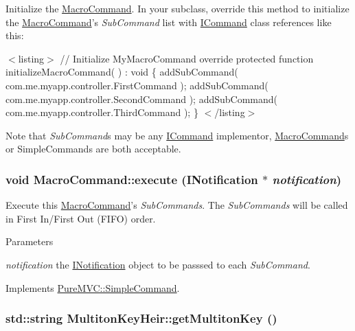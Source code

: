 Initialize the {\ttfamily \hyperlink{class_pure_m_v_c_1_1_macro_command}{MacroCommand}}. In your subclass, override this method to initialize the {\ttfamily \hyperlink{class_pure_m_v_c_1_1_macro_command}{MacroCommand}}'s {\itshape SubCommand\/} list with {\ttfamily \hyperlink{class_pure_m_v_c_1_1_i_command}{ICommand}} class references like this:

$<$listing$>$ // Initialize MyMacroCommand override protected function initializeMacroCommand( ) : void \{ addSubCommand( com.me.myapp.controller.FirstCommand ); addSubCommand( com.me.myapp.controller.SecondCommand ); addSubCommand( com.me.myapp.controller.ThirdCommand ); \} $<$/listing$>$

Note that {\itshape SubCommand\/}s may be any {\ttfamily \hyperlink{class_pure_m_v_c_1_1_i_command}{ICommand}} implementor, {\ttfamily \hyperlink{class_pure_m_v_c_1_1_macro_command}{MacroCommand}}s or {\ttfamily SimpleCommands} are both acceptable. \hypertarget{class_pure_m_v_c_1_1_macro_command_a23d3bdc5519b108646e1b169e5eaa219}{
\subsubsection[{execute}]{\setlength{\rightskip}{0pt plus 5cm}void MacroCommand::execute ({\bf INotification} $\ast$ {\em notification})}}
\label{class_pure_m_v_c_1_1_macro_command_a23d3bdc5519b108646e1b169e5eaa219}


Execute this {\ttfamily \hyperlink{class_pure_m_v_c_1_1_macro_command}{MacroCommand}}'s {\itshape SubCommands\/}. The {\itshape SubCommands\/} will be called in First In/First Out (FIFO) order.


\begin{DoxyParams}{Parameters}
\item[{\em notification}]the {\ttfamily \hyperlink{class_pure_m_v_c_1_1_i_notification}{INotification}} object to be passsed to each {\itshape SubCommand\/}. \end{DoxyParams}


Implements \hyperlink{class_pure_m_v_c_1_1_simple_command_af3f75f1ff33ba4afabec5ee2a8a83d20}{PureMVC::SimpleCommand}.\hypertarget{class_pure_m_v_c_1_1_multiton_key_heir_aa5622459d33380deb08dc3cab8b991c7}{
\subsubsection[{getMultitonKey}]{\setlength{\rightskip}{0pt plus 5cm}std::string MultitonKeyHeir::getMultitonKey ()}}
\label{class_pure_m_v_c_1_1_multiton_key_heir_aa5622459d33380deb08dc3cab8b991c7}


